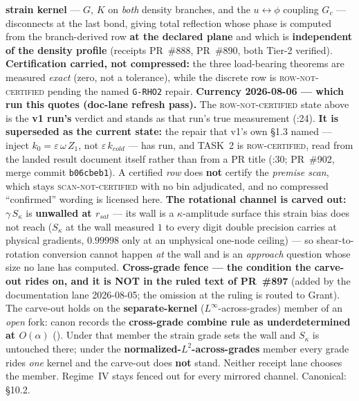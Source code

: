 \begin{enumerate}
    \textbf{strain kernel} --- $G$, $K$ on \emph{both} density branches, and
    the $u \leftrightarrow \phi$ coupling $G_c$ --- disconnects at the last
    bond, giving total reflection whose phase is computed from the
    branch-derived row \textbf{at the declared plane} and which is
    \textbf{independent of the density profile} (receipts PR~\#888, PR~\#890,
    both Tier-2 verified). \textbf{Certification carried, not compressed:} the
    three load-bearing theorems are measured \emph{exact} (zero, not a
    tolerance), while the discrete row is \textsc{row-not-certified} pending
    the named \texttt{G-RHO2} repair. \textbf{Currency 2026-08-06 --- which run this quotes (doc-lane refresh pass).} The \textsc{row-not-certified} state above is the \textbf{v1 run's} verdict and stands as that run's true measurement (:24). \textbf{It is superseded as the current state:} the repair that v1's own \S1.3 named --- inject $k_0 = \varepsilon\,\omega\,Z_1$, not $\varepsilon\,k_{cold}$ --- has run, and TASK~2 is \textsc{row-certified}, read from the landed result document itself rather than from a PR title (:30; PR~\#902, merge commit \texttt{b06cbeb1}). A certified \emph{row} does \textbf{not} certify the \emph{premise scan}, which stays \textsc{scan-not-certified} with no bin adjudicated, and no compressed ``confirmed'' wording is licensed here. \textbf{The rotational channel is carved
    out:} $\gamma\,S_\kappa$ is \textbf{unwalled at $r_{sat}$} --- its wall is
    a $\kappa$-amplitude surface this strain bias does not reach ($S_\kappa$
    at the wall measured $1$ to every digit double precision carries at
    physical gradients, $0.99998$ only at an unphysical one-node ceiling) ---
    so shear-to-rotation conversion cannot happen \emph{at} the wall and is an
    \emph{approach} question whose size no lane has computed.
    \textbf{Cross-grade fence --- the condition the carve-out rides on, and it
    is NOT in the ruled text of PR~\#897} (added by the documentation lane
    2026-08-05; the omission at the ruling is routed to Grant). The carve-out
    holds on the \textbf{separate-kernel} ($L^\infty$-across-grades) member of
    an \emph{open} fork: canon records the \textbf{cross-grade combine rule as
    underdetermined at $O(\alpha)$} ().
    Under that member the strain grade sets the wall and $S_\kappa$ is
    untouched there; under the \textbf{normalized-$L^2$-across-grades} member
    every grade rides \emph{one} kernel and the carve-out does \textbf{not}
    stand. Neither receipt lane chooses the member. Regime~IV stays
    fenced out for every mirrored channel. Canonical:
     \S10.2.


\end{enumerate}
